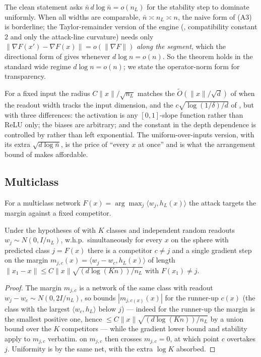 \begin{remark}\label{rem:widthcond}
The clean statement asks $\bar n\,d\log\bar n=o(n_L)$ for the stability step to dominate uniformly.
When all widths are comparable, $\bar n\asymp n_L\asymp n$, the naive form of (A3) is borderline; the
Taylor-remainder version of the engine (\cite[Thm 4.6]{advExt}, compatibility constant $2$ and only the
attack-line curvature) needs only $\|\nabla F(x')-\nabla F(x)\|=o(\|\nabla F\|)$ \emph{along the
segment}, which the directional form of  gives whenever $d\log n=o(n)$. So the
theorem holds in the standard wide regime $d\log n=o(n)$; we state the operator-norm form for
transparency.
\end{remark}

\begin{remark}\label{rem:scale}
For a fixed input the radius $C\|x\|/\sqrt{n_L}$ matches the $\tilde O(\|x\|/\sqrt d)$ of
\cite{danielyS20} when the readout width tracks the input dimension, and the
$c\sqrt{\log(1/\delta)/d}$ of \cite{bartlettBC21}, but with three differences: the activation is any
$[0,1]$-slope function rather than ReLU only; the biases are arbitrary; and the constant in the depth
dependence is controlled by  rather than left exponential. The uniform-over-inputs
version, with its extra $\sqrt{d\log\bar n}$, is the price of ``every $x$ at once'' and is what the
arrangement bound of  makes affordable.
\end{remark}

\subsection{Multiclass}
For a multiclass network $F(x)=\arg\max_j\langle w_j,h_L(x)\rangle$ the attack targets the margin
against a fixed competitor.

\begin{theorem}\label{thm:multiclass}
Under the hypotheses of  with $K$ classes and independent random readouts
$w_j\sim N(0,I/n_L)$, w.h.p.\ simultaneously for every $x$ on the sphere with predicted class
$j=F(x)$ there is a competitor $c\ne j$ and a single gradient step on the margin
$m_{j,c}(x)=\langle w_j-w_c,h_L(x)\rangle$ of length
$\|x_1-x\|\le C\|x\|\sqrt{(d\log(Kn))/n_L}$ with $F(x_1)\ne j$.
\end{theorem}

\begin{proof}
The margin $m_{j,c}$ is a network of the same class with readout $w_j-w_c\sim N(0,2I/n_L)$, so
 bounds $|m_{j,c(x)}(x)|$ for the runner-up $c(x)$ (the class with the largest
$\langle w_c,h_L\rangle$ below $j$) --- indeed for the runner-up the margin is the smallest positive
one, hence $\le C\|x\|\sqrt{(d\log(Kn))/n_L}$ by a union bound over the $K$ competitors --- while the
gradient lower bound and stability apply to $m_{j,c}$ verbatim.  on $m_{j,c}$ then
crosses $m_{j,c}=0$, at which point $c$ overtakes $j$. Uniformity is by the same net, with the extra
$\log K$ absorbed.
\end{proof}


